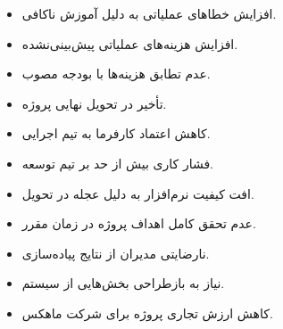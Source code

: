 \documentclass[12pt,a4paper]{report}
\begin{document}
\begin{itemize}
\item 
افزایش خطاهای عملیاتی به دلیل آموزش ناکافی.
\item 
افزایش هزینه‌های عملیاتی پیش‌بینی‌نشده.
\item 
عدم تطابق هزینه‌ها با بودجه مصوب.
\item 
تأخیر در تحویل نهایی پروژه.
\item 
کاهش اعتماد کارفرما به تیم اجرایی.
\item 
فشار کاری بیش از حد بر تیم توسعه.
\item 
افت کیفیت نرم‌افزار به دلیل عجله در تحویل.
\item 
عدم تحقق کامل اهداف پروژه در زمان مقرر.
\item 
نارضایتی مدیران از نتایج پیاده‌سازی.
\item 
نیاز به بازطراحی بخش‌هایی از سیستم.
\item 
کاهش ارزش تجاری پروژه برای شرکت ماهکس.
\end{itemize}
\end{document}
